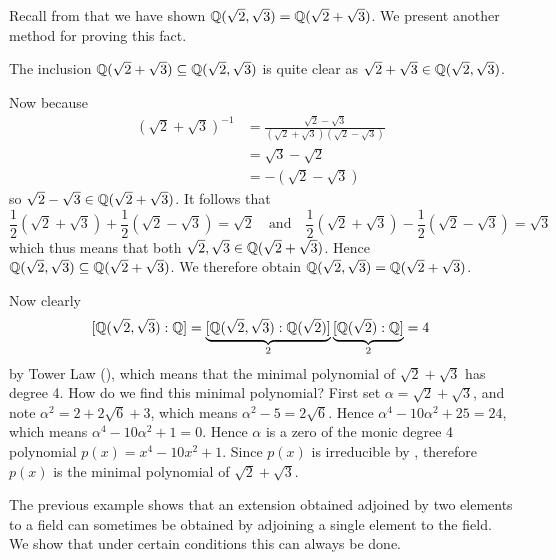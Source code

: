 \begin{example}
    Recall from  that we have shown $\mathbb{Q}(\sqrt2, \sqrt3) = \mathbb{Q}(\sqrt2 + \sqrt3)$. We present another method for proving this fact.

    The inclusion $\mathbb{Q}(\sqrt2 + \sqrt3) \subseteq \mathbb{Q}(\sqrt2, \sqrt3)$ is quite clear as $\sqrt2 + \sqrt3 \in \mathbb{Q}(\sqrt2, \sqrt3)$.

    Now because
    \begin{align*}
        \left(\sqrt2 + \sqrt3\right)^{-1} &= \frac{\sqrt2-\sqrt3}{(\sqrt2+\sqrt3)(\sqrt2-\sqrt3)}\\
        &= \sqrt3-\sqrt2\\
        &= -(\sqrt2 - \sqrt3)
    \end{align*}
    so $\sqrt2 - \sqrt3 \in \mathbb{Q}(\sqrt2 + \sqrt3)$. It follows that
    \[
        \frac12\left(\sqrt2 + \sqrt3\right) + \frac12\left(\sqrt2 - \sqrt3\right) = \sqrt2 \quad\text{and}\quad \frac12\left(\sqrt2 + \sqrt3\right) - \frac12\left(\sqrt2 - \sqrt3\right) = \sqrt3
    \]
    which thus means that both $\sqrt2, \sqrt3 \in \mathbb{Q}(\sqrt2+\sqrt3)$. Hence $\mathbb{Q}(\sqrt2, \sqrt3) \subseteq \mathbb{Q}(\sqrt2 + \sqrt3)$. We therefore obtain $\mathbb{Q}(\sqrt2, \sqrt3) = \mathbb{Q}(\sqrt2+\sqrt3)$.

    Now clearly
    \[
        [\mathbb{Q}(\sqrt2, \sqrt3): \mathbb{Q}] = \underbrace{[\mathbb{Q}(\sqrt2, \sqrt3): \mathbb{Q}(\sqrt2)]}_2\underbrace{[\mathbb{Q}(\sqrt2):\mathbb{Q}]}_2 = 4
    \]
    by Tower Law (), which means that the minimal polynomial of $\sqrt2+\sqrt3$ has degree 4. How do we find this minimal polynomial? First set $\alpha = \sqrt2 + \sqrt3$, and note $\alpha^2 = 2 + 2\sqrt6 + 3$, which means $\alpha^2 - 5 = 2\sqrt6$. Hence $\alpha^4 - 10\alpha^2 + 25 = 24$, which means $\alpha^4 - 10\alpha^2 + 1 = 0$. Hence $\alpha$ is a zero of the monic degree 4 polynomial $p(x) = x^4 - 10x^2 + 1$. Since $p(x)$ is irreducible by , therefore $p(x)$ is the minimal polynomial of $\sqrt2 + \sqrt3$.
\end{example}

The previous example shows that an extension obtained adjoined by two elements to a field can sometimes be obtained by adjoining a single element to the field. We show that under certain conditions this can always be done.

